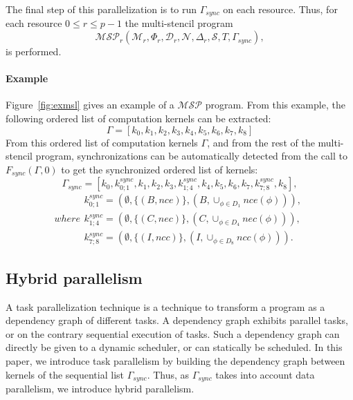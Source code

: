  The final step of this parallelization is to run $\Gamma_{sync}$ on each resource. Thus, for each resource $0 \leq r \leq p-1$ the multi-stencil program 
\begin{equation}
\mathcal{MSP}_r(\mathcal{M}_r,\Phi_r,\mathcal{D}_r,\mathcal{N},\Delta_r,\mathcal{S},T,\Gamma_{sync}),
\end{equation}
is performed.

\paragraph{\textbf{Example}} Figure~\ref{fig:exmsl} gives an example of a $\mathcal{MSP}$ program. From this example, the following ordered list of computation kernels can be extracted:
\begin{equation*}
\Gamma = [k_0,k_1,k_2,k_3,k_4,k_5,k_6,k_7,k_8]
\end{equation*}
From this ordered list of computation kernels $\Gamma$, and from the rest of the multi-stencil program, synchronizations can be automatically detected from the call to $F_{sync}(\Gamma,0)$ to get the synchronized ordered list of kernels:
\begin{equation}
\Gamma_{sync} = [k_0,k_{0;1}^{sync},k_1,k_2,k_3,k_{1;4}^{sync},k_4,k_5,k_6,k_7,k_{7;8}^{sync},k_8],
\label{eq:exsync}
\end{equation}
\begin{subequations}
where
\begin{align}
        k_{0;1}^{sync}=(\emptyset,\{(B,nce)\},(B,\cup_{\phi \in D_1} nce(\phi))),\\
        k_{1;4}^{sync}=(\emptyset,\{(C,nec)\},(C,\cup_{\phi \in D_4} nec(\phi))),\\
        k_{7;8}^{sync}=(\emptyset,\{(I,ncc)\},(I,\cup_{\phi \in D_8} ncc(\phi))).
\end{align}
\end{subequations}

\subsection{Hybrid parallelism}
A task parallelization technique is a technique to transform a program as a dependency graph of different tasks. A dependency graph exhibits parallel tasks, or on the contrary sequential execution of tasks. Such a dependency graph can directly be given to a dynamic scheduler, or can statically be scheduled. In this paper, we introduce task parallelism by building the dependency graph between kernels of the sequential list $\Gamma_{sync}$. Thus, as $\Gamma_{sync}$ takes into account data parallelism, we introduce hybrid parallelism.

